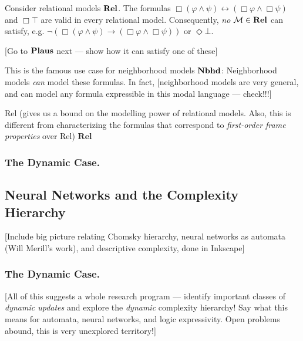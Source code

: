 \documentclass[letterpaper]{article}
\begin{document}
\begin{example}
    Consider relational models $\textrm{\textbf{Rel}}$.  The formulas $\Box(\varphi \land \psi) \leftrightarrow (\Box \varphi \land \Box \psi)$ and $\Box \top$ are valid in every relational model.  Consequently, \emph{no} $\mathcal{M} \in \textrm{\textbf{Rel}}$ can satisfy, e.g. $\neg (\Box(\varphi \land \psi) \to (\Box \varphi \land \Box \psi))$ or $\Diamond \bot$.

    [Go to $\textrm{\textbf{Plaus}}$ next --- show how it can satisfy one of these]

    This is the famous use case for neighborhood models $\textrm{\textbf{Nbhd}}$: Neighborhood models \emph{can} model these formulas.  In fact, [neighborhood models are very general, and can model any formula expressible in this modal language --- check!!!]
    
    Rel (gives us a bound on the modelling power of relational models.  Also, this is different from characterizing the formulas that correspond to \emph{first-order frame properties} over Rel)
    $\textbf{Rel}$
\end{example}

\subsubsection*{The Dynamic Case.}

\subsection*{Neural Networks and the Complexity Hierarchy}

[Include big picture relating Chomsky hierarchy, neural networks as automata (Will Merill's work), and descriptive complexity, done in Inkscape]

\subsubsection*{The Dynamic Case.}

[All of this suggests a whole research program --- identify important classes of \emph{dynamic updates} and explore the \emph{dynamic} complexity hierarchy! Say what this means for automata, neural networks, and logic expressivity.  Open problems abound, this is very unexplored territory!]

\printbibliography
\end{document}
